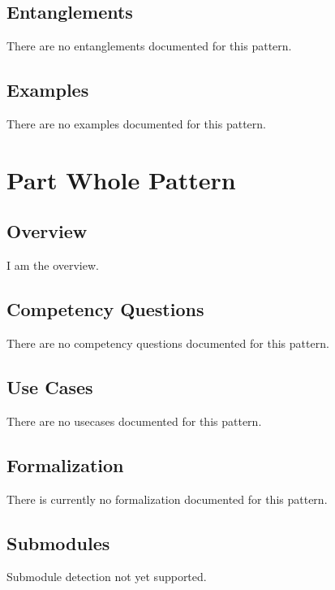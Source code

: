 \subsection{Entanglements}
\label{ssec:entanglements}
There are no entanglements documented for this pattern.

\subsection{Examples}
\label{ssec:examples}
There are no examples documented for this pattern.


\section{Part Whole Pattern}
\label{sec:part-whole-pattern}
\subsection{Overview}
\label{ssec:overview}
I am the overview.

\subsection{Competency Questions}
\label{ssec:cqs}
There are no competency questions documented for this pattern.

\subsection{Use Cases}
\label{ssec:use-cases}
There are no usecases documented for this pattern.
\subsection{Formalization}
\label{ssec:formalization}
There is currently no formalization documented for this pattern.

\subsection{Submodules}
\label{ssec:submodules}
Submodule detection not yet supported.

